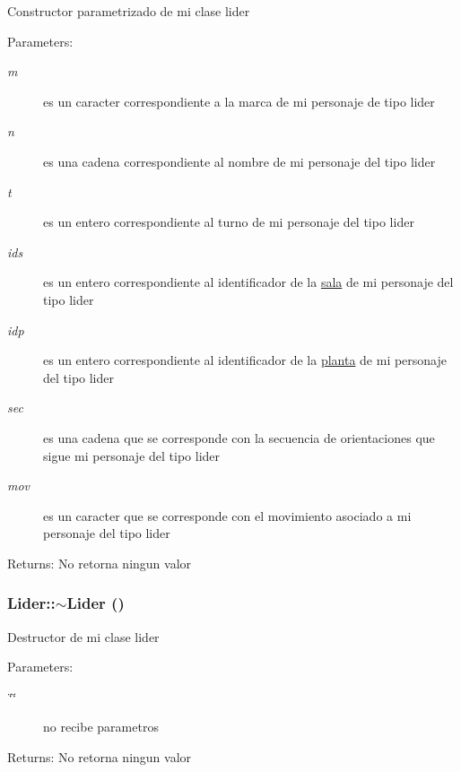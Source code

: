 Constructor parametrizado de mi clase lider \begin{Desc}
\item[Parameters:]
\begin{description}
\item[{\em m}]es un caracter correspondiente a la marca de mi personaje de tipo lider \item[{\em n}]es una cadena correspondiente al nombre de mi personaje del tipo lider \item[{\em t}]es un entero correspondiente al turno de mi personaje del tipo lider \item[{\em ids}]es un entero correspondiente al identificador de la \hyperlink{classsala}{sala} de mi personaje del tipo lider \item[{\em idp}]es un entero correspondiente al identificador de la \hyperlink{classplanta}{planta} de mi personaje del tipo lider \item[{\em sec}]es una cadena que se corresponde con la secuencia de orientaciones que sigue mi personaje del tipo lider \item[{\em mov}]es un caracter que se corresponde con el movimiento asociado a mi personaje del tipo lider \end{description}
\end{Desc}
\begin{Desc}
\item[Returns:]No retorna ningun valor \end{Desc}
\hypertarget{classLider_64481cdebf71c9b28ec7aef689fed43e}{
\subsubsection[$\sim$Lider]{\setlength{\rightskip}{0pt plus 5cm}Lider::$\sim$Lider ()}}
\label{classLider_64481cdebf71c9b28ec7aef689fed43e}


Destructor de mi clase lider \begin{Desc}
\item[Parameters:]
\begin{description}
\item[{\em \char`\"{}\char`\"{}}]no recibe parametros \end{description}
\end{Desc}
\begin{Desc}
\item[Returns:]No retorna ningun valor \end{Desc}


